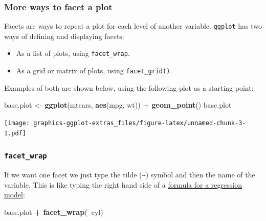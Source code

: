 \documentclass[]{article}
\newenvironment{Shaded}{\begin{snugshade}}{\end{snugshade}}
\newcommand{\KeywordTok}[1]{\textcolor[rgb]{0.13,0.29,0.53}{\textbf{#1}}}
\newcommand{\NormalTok}[1]{#1}
\newcommand{\OperatorTok}[1]{\textcolor[rgb]{0.81,0.36,0.00}{\textbf{#1}}}
\newcommand{\StringTok}[1]{\textcolor[rgb]{0.31,0.60,0.02}{#1}}
\providecommand{\tightlist}{%
  \setlength{\itemsep}{0pt}\setlength{\parskip}{0pt}}
\begin{document}
\hypertarget{facetting-plots}{%
\subsubsection*{More ways to facet a plot}\label{facetting-plots}}

Facets are ways to repeat a plot for each level of another variable. \texttt{ggplot}
has two ways of defining and displaying facets:

\begin{itemize}
\tightlist
\item
  As a list of plots, using \texttt{facet\_wrap}.
\item
  As a grid or matrix of plots, using \texttt{facet\_grid()}.
\end{itemize}

Examples of both are shown below, using the following plot as a starting point:

\begin{Shaded}
\begin{Highlighting}[]
\NormalTok{base.plot <-}\StringTok{ }\KeywordTok{ggplot}\NormalTok{(mtcars, }\KeywordTok{aes}\NormalTok{(mpg, wt)) }\OperatorTok{+}\StringTok{ }\KeywordTok{geom_point}\NormalTok{()}
\NormalTok{base.plot}
\end{Highlighting}
\end{Shaded}

\texttt{[image: graphics-ggplot-extras\_files/figure-latex/unnamed-chunk-3-1.pdf]}

\hypertarget{facet_wrap}{%
\subsubsection*{\texorpdfstring{\texttt{facet\_wrap}}{facet\_wrap}}\label{facet_wrap}}

If we want one facet we just type the tilde (\texttt{\textasciitilde{}}) symbol and then the name of
the variable. This is like typing the right hand side of a
\href{formulae}{formula for a regression model}:

\begin{Shaded}
\begin{Highlighting}[]
\NormalTok{base.plot }\OperatorTok{+}\StringTok{ }\KeywordTok{facet_wrap}\NormalTok{(}\OperatorTok{~}\NormalTok{cyl)}
\end{Highlighting}
\end{Shaded}
\end{document}
